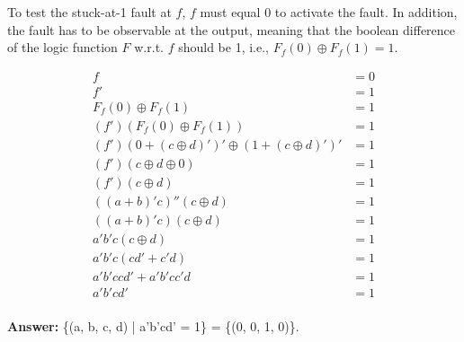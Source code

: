 To test the stuck-at-1 fault at $f$, $f$ must equal 0 to activate the fault. In addition, the fault has to be observable at the output, meaning that the boolean difference of the logic function $F$ w.r.t. $f$ should be 1, i.e., $F_f(0) \oplus F_f(1) = 1$.

\begin{align*} 
f &= 0 \\
f' &= 1 \\
F_f(0) \oplus F_f(1) &= 1 \\
(f')(F_f(0) \oplus F_f(1)) &= 1 \\
(f')(0 + (c \oplus d)')' \oplus (1 + (c \oplus d)')' &= 1 \\ 
(f')(c \oplus d \oplus 0) &= 1 \\
(f')(c \oplus d) &= 1 \\
((a+b)'c)''(c \oplus d) &= 1 \\
((a+b)'c)(c \oplus d) &= 1 \\
a'b'c(c \oplus d) &= 1 \\
a'b'c(cd'+c'd) &= 1 \\
a'b'ccd'+a'b'cc'd &= 1 \\
a'b'cd' &= 1 \\
\end{align*}

\textbf{Answer:} \{(a, b, c, d) | a'b'cd' = 1\} = \{(0, 0, 1, 0)\}.

